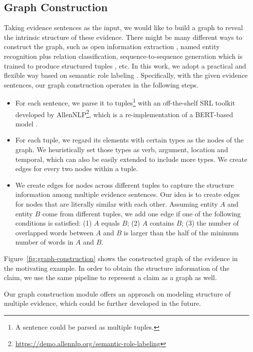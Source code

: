 \documentclass[11pt,a4paper]{article}
\begin{document}
\subsection{Graph Construction}
\label{section:graph-construction}
Taking evidence sentences as the input, we would like to build a graph to reveal the intrinsic structure of these evidence.
There might be many different ways to construct the graph, such as open information extraction \cite{banko2007open}, named entity recognition plus relation classification, sequence-to-sequence generation which is trained to produce structured tuples \cite{goodrich2019assessing}, etc. 
In this work, we adopt a practical and flexible way based on semantic role labeling \cite{carreras2004introduction}. 
Specifically, with the given evidence sentences, our graph construction operates in the following steps. 
\begin{itemize}
	\item 
	For each sentence, we parse it to tuples\footnote{A sentence could be parsed as multiple tuples.} with an off-the-shelf SRL toolkit developed by AllenNLP\footnote{\url{https://demo.allennlp.org/semantic-role-labeling}}, which is a re-implementation of a BERT-based model \cite{shi2019simple}.
\item For each tuple, we regard its elements with certain types as the nodes of the graph.
We heuristically set those types as verb, argument, location and temporal, which can also be easily extended to include more types.
We create edges for every two nodes within a tuple.
\item We create edges for nodes across different tuples to capture the structure information among multiple evidence sentences.
	Our idea is to create edges for nodes that are literally similar with each other.
Assuming entity $A$ and entity $B$ come from different tuples,  we add one edge if one of the following conditions is satisfied: (1) $A$ equals $B$; (2) $A$ contains $B$; (3) the number of overlapped words between $A$ and $B$ is larger than the half of the minimum number of words in $A$ and $B$.
\end{itemize}
Figure~\ref{fig:graph-construction} shows the constructed graph of the evidence in the motivating example.
In order to obtain the structure information of the claim, we use the same pipeline to represent a claim as a graph as well.

Our graph construction module offers an approach on modeling structure of multiple evidence, which could be further developed in the future.
\end{document}
